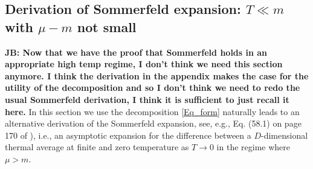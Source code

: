 \documentclass[sn-mathphys,Numbered]{sn-jnl}
\begin{document}
\subsection{Derivation of Sommerfeld expansion: $T\ll m$ with $\mu-m$ not small}\label{Section:Sommerfeld}
{\bf JB: Now that we have the proof that Sommerfeld holds in an appropriate high temp regime, I don't think we need this section anymore.  I think the derivation in the appendix makes the case for the utility of the decomposition and so I don't think we need to redo the usual Sommerfeld derivation, I think it is sufficient to just recall it here.}
In this section we use the decomposition \eqref{Eq_form} naturally leads to an alternative derivation of the Sommerfeld expansion, see, e.g., Eq. (58.1) on page 170 of \cite{landau2013statistical}), i.e., an  asymptotic expansion for the difference between a $D$-dimensional thermal average at finite and zero temperature as $T\to 0$ in the regime where  $\mu>m$.     
\end{document}
